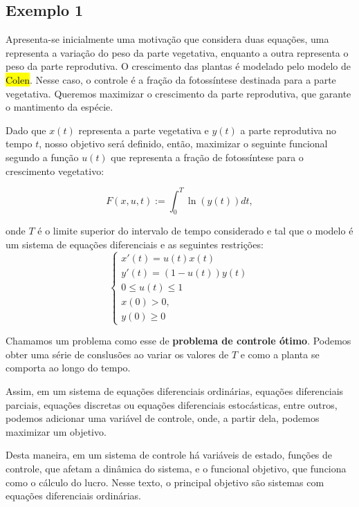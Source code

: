 \subsection*{Exemplo 1}

Apresenta-se inicialmente uma motivação que considera duas equações, uma
representa a variação do peso da parte vegetativa, enquanto a outra representa
o peso da parte reprodutiva. O crescimento das plantas é modelado pelo modelo
de \hl{Colen}. Nesse caso, o controle é a fração da fotossíntese destinada
para a parte vegetativa. Queremos maximizar o crescimento da parte
reprodutiva, que garante o mantimento da espécie. 

Dado que $x(t)$ representa a parte vegetativa e $y(t)$ a parte reprodutiva no
tempo $t$, nosso objetivo será definido, então, maximizar o seguinte
funcional segundo a função $u(t)$ que representa a fração de fotossíntese para
o crescimento vegetativo: 

\begin{equation}
    F(x,u,t) := \int_0^T \ln(y(t))dt, 
\end{equation}

onde $T$ é o limite superior do intervalo de tempo considerado e tal que o modelo é um sistema de equações diferenciais e as seguintes
restrições: 
\begin{equation}
    \begin{cases}
    x'(t) = u(t)x(t) \\
    y'(t) = (1 - u(t))y(t) \\
    0 \leq u(t) \leq 1 \\
    x(0) > 0, \\
    y(0) \geq 0
    \end{cases}    
\end{equation}

Chamamos um problema como esse de \textbf{problema de controle ótimo}. Podemos
obter uma série de conslusões ao variar os valores de $T$ e como a planta se
comporta ao longo do tempo. 

Assim, em um sistema de equações diferenciais ordinárias, equações
diferenciais parciais, equações discretas ou equações diferenciais
estocásticas, entre outros, podemos adicionar uma variável de controle, onde,
a partir dela, podemos maximizar um objetivo. 

Desta maneira, em um sistema de controle há variáveis de estado, funções de
controle, que afetam a dinâmica do sistema, e o funcional objetivo, que
funciona como o cálculo do lucro. Nesse texto, o principal objetivo são
sistemas com equações diferenciais ordinárias. 

